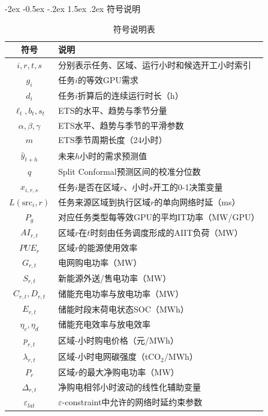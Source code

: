 \documentclass{article}
\makeatletter
\renewcommand\section{\@startsection{section}{1}{\z@}%
 {-2ex \@plus -0.5ex \@minus -.2ex}
 {1.5ex \@plus.2ex}
 {\centering\heiti\zihao{4}}}
\makeatother
\begin{document}
\section{符号说明}

\begin{table}[H]
\centering
\caption{符号说明表}
\begin{tabularx}{\textwidth}{c>{\centering\arraybackslash}X}
\toprule
符号&说明\\
\midrule
$i,r,t,s$&分别表示任务、区域、运行小时和候选开工小时索引\\
$g_i$&任务$i$的等效GPU需求\\
$d_i$&任务$i$折算后的连续运行时长（h）\\
$\ell_t,b_t,s_t$&ETS的水平、趋势与季节分量\\
$\alpha,\beta,\gamma$&ETS水平、趋势与季节的平滑参数\\
$m$&ETS季节周期长度（24小时）\\
$\hat{y}_{t+h}$&未来$h$小时的需求预测值\\
$q$&Split Conformal预测区间的校准分位数\\
$x_{i,r,s}$&任务$i$是否在区域$r$、小时$s$开工的0-1决策变量\\
$L(\mathrm{src}_i,r)$&任务来源区域到执行区域$r$的单向网络时延（ms）\\
$P_g$&对应任务类型每等效GPU的平均IT功率（MW/GPU）\\
$AI_{r,t}$&区域$r$在$t$时刻由任务调度形成的AIIT负荷（MW）\\
$PUE_r$&区域$r$的能源使用效率\\
$G_{r,t}$&电网购电功率（MW）\\
$S_{r,t}$&新能源外送/售电功率（MW）\\
$C_{r,t},D_{r,t}$&储能充电功率与放电功率（MW）\\
$E_{r,t}$&储能时段末荷电状态SOC（MWh）\\
$\eta_c,\eta_d$&储能充电效率与放电效率\\
$p_{r,t}$&区域-小时购电价格（元/MWh）\\
$\lambda_{r,t}$&区域-小时电网碳强度（tCO$_2$/MWh）\\
$P_r$&区域$r$的最大净购电功率（MW）\\
$\Delta_{r,t}$&净购电相邻小时波动的线性化辅助变量\\
$\varepsilon_{lat}$&$\varepsilon$-constraint中允许的网络时延约束参数\\
\bottomrule
\end{tabularx}
\end{table}
\end{document}
